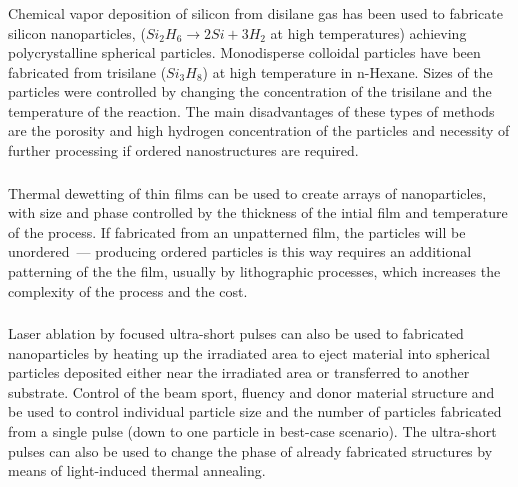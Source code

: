         \subsubsection{}
                Chemical vapor deposition of silicon from disilane gas has been used to fabricate silicon nanoparticles, ($Si_2H_6 \rightarrow 2Si + 3H_2$ at
            high temperatures) achieving polycrystalline spherical particles\cite{shi2012new}. Monodisperse colloidal particles have been fabricated from trisilane ($Si_3H_8$)
            at high temperature in n-Hexane\cite{shi2013monodisperse}. Sizes of the particles were controlled by changing the concentration of the trisilane and the temperature of the
            reaction. The main disadvantages of these types of methods are the porosity and high hydrogen concentration of the particles and necessity of
            further processing if ordered nanostructures are required.

        \subsubsection{}
                Thermal dewetting of thin films can be used to create arrays of nanoparticles, with size and phase controlled by the thickness of the intial
            film and temperature of the process\cite{abbarchi2014wafer}. If fabricated from an unpatterned film, the particles will be unordered~--- producing ordered particles is this
            way requires an additional patterning of the the film, usually by lithographic processes, which increases the complexity of the process and the cost.

        \subsubsection{}
                Laser ablation by focused ultra-short pulses can also be used to fabricated nanoparticles by heating up the irradiated area to eject material into
            spherical particles deposited either near the irradiated area or transferred to another substrate\cite{zywietz2014laser}. Control of the beam sport, fluency and donor material
            structure and be used to control individual particle size and the number of particles fabricated from a single pulse (down to one particle in best-case
            scenario). The ultra-short pulses can also be used to change the phase of already fabricated structures by means of light-induced thermal annealing.

